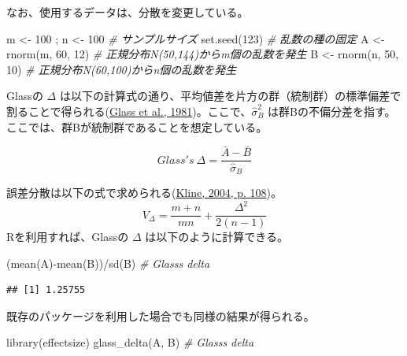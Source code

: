 \documentclass[
  ja=standard, xelatex, base=12pt]{bxjsreport}
\newenvironment{Shaded}{\begin{snugshade}}{\end{snugshade}}
\newcommand{\CommentTok}[1]{\textcolor[rgb]{0.56,0.35,0.01}{\textit{#1}}}
\newcommand{\DecValTok}[1]{\textcolor[rgb]{0.00,0.00,0.81}{#1}}
\newcommand{\FunctionTok}[1]{\textcolor[rgb]{0.00,0.00,0.00}{#1}}
\newcommand{\NormalTok}[1]{#1}
\newcommand{\OtherTok}[1]{\textcolor[rgb]{0.56,0.35,0.01}{#1}}
\newcommand{\SpecialCharTok}[1]{\textcolor[rgb]{0.00,0.00,0.00}{#1}}
\begin{document}
なお、使用するデータは、分散を変更している。

\begin{Shaded}
\begin{Highlighting}[]
\NormalTok{m }\OtherTok{\textless{}{-}} \DecValTok{100}\NormalTok{ ; n }\OtherTok{\textless{}{-}} \DecValTok{100}   \CommentTok{\# サンプルサイズ}
\FunctionTok{set.seed}\NormalTok{(}\DecValTok{123}\NormalTok{)         }\CommentTok{\# 乱数の種の固定}
\NormalTok{A }\OtherTok{\textless{}{-}} \FunctionTok{rnorm}\NormalTok{(m, }\DecValTok{60}\NormalTok{, }\DecValTok{12}\NormalTok{) }\CommentTok{\# 正規分布N(50,144)からm個の乱数を発生}
\NormalTok{B }\OtherTok{\textless{}{-}} \FunctionTok{rnorm}\NormalTok{(n, }\DecValTok{50}\NormalTok{, }\DecValTok{10}\NormalTok{) }\CommentTok{\# 正規分布N(60,100)からn個の乱数を発生}
\end{Highlighting}
\end{Shaded}

Glassの \(\Delta\) は以下の計算式の通り、平均値差を片方の群（統制群）の標準偏差で割ることで得られる(\protect\hyperlink{ref-glass1981}{Glass et al., 1981})。ここで、\(\hat\sigma_B^2\) は群Bの不偏分差を指す。ここでは、群Bが統制群であることを想定している。

\[
Glass's~\Delta =\frac{\bar{A}-\bar{B}}{\hat\sigma_B} 
\]

誤差分散は以下の式で求められる(\protect\hyperlink{ref-kline2004}{Kline, 2004, p. 108})。\[
V_{\Delta}=\frac{m+n}{mn}+\frac {\Delta^2}{2(n-1)} 
\] Rを利用すれば、Glassの \(\Delta\) は以下のように計算できる。

\begin{Shaded}
\begin{Highlighting}[]
\NormalTok{(}\FunctionTok{mean}\NormalTok{(A)}\SpecialCharTok{{-}}\FunctionTok{mean}\NormalTok{(B))}\SpecialCharTok{/}\FunctionTok{sd}\NormalTok{(B)  }\CommentTok{\# Glass\textquotesingle{}s delta}
\end{Highlighting}
\end{Shaded}

\begin{verbatim}
## [1] 1.25755
\end{verbatim}

既存のパッケージを利用した場合でも同様の結果が得られる。

\begin{Shaded}
\begin{Highlighting}[]
\FunctionTok{library}\NormalTok{(effectsize)}
\FunctionTok{glass\_delta}\NormalTok{(A, B)  }\CommentTok{\# Glass\textquotesingle{}s delta}
\end{Highlighting}
\end{Shaded}
\end{document}
